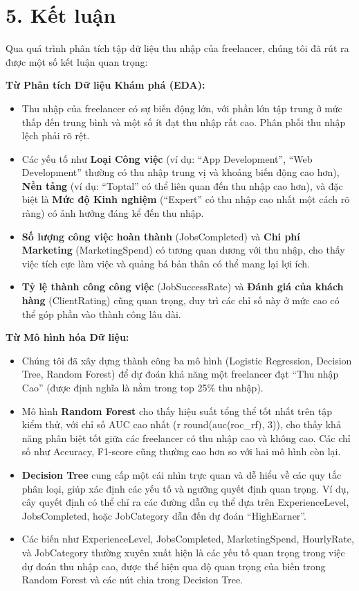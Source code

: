 \documentclass[
]{article}
\begin{document}
\section{5. Kết luận}\label{kux1ebft-luux1eadn}

Qua quá trình phân tích tập dữ liệu thu nhập của freelancer, chúng tôi
đã rút ra được một số kết luận quan trọng:

\textbf{Từ Phân tích Dữ liệu Khám phá (EDA):}

\begin{itemize}
\item
  Thu nhập của freelancer có sự biến động lớn, với phần lớn tập trung ở
  mức thấp đến trung bình và một số ít đạt thu nhập rất cao. Phân phối
  thu nhập lệch phải rõ rệt.
\item
  Các yếu tố như \textbf{Loại Công việc} (ví dụ: ``App Development'',
  ``Web Development'' thường có thu nhập trung vị và khoảng biến động
  cao hơn), \textbf{Nền tảng} (ví dụ: ``Toptal'' có thể liên quan đến
  thu nhập cao hơn), và đặc biệt là \textbf{Mức độ Kinh nghiệm}
  (``Expert'' có thu nhập cao nhất một cách rõ ràng) có ảnh hưởng đáng
  kể đến thu nhập.
\item
  \textbf{Số lượng công việc hoàn thành} (JobsCompleted) và \textbf{Chi
  phí Marketing} (MarketingSpend) có tương quan dương với thu nhập, cho
  thấy việc tích cực làm việc và quảng bá bản thân có thể mang lại lợi
  ích.
\item
  \textbf{Tỷ lệ thành công công việc} (JobSuccessRate) và \textbf{Đánh
  giá của khách hàng} (ClientRating) cũng quan trọng, duy trì các chỉ số
  này ở mức cao có thể góp phần vào thành công lâu dài.
\end{itemize}

\textbf{Từ Mô hình hóa Dữ liệu:}

\begin{itemize}
\item
  Chúng tôi đã xây dựng thành công ba mô hình (Logistic Regression,
  Decision Tree, Random Forest) để dự đoán khả năng một freelancer đạt
  ``Thu nhập Cao'' (được định nghĩa là nằm trong top 25\% thu nhập).
\item
  Mô hình \textbf{Random Forest} cho thấy hiệu suất tổng thể tốt nhất
  trên tập kiểm thử, với chỉ số AUC cao nhất (r round(auc(roc\_rf), 3)),
  cho thấy khả năng phân biệt tốt giữa các freelancer có thu nhập cao và
  không cao. Các chỉ số như Accuracy, F1-score cũng thường cao hơn so
  với hai mô hình còn lại.
\item
  \textbf{Decision Tree} cung cấp một cái nhìn trực quan và dễ hiểu về
  các quy tắc phân loại, giúp xác định các yếu tố và ngưỡng quyết định
  quan trọng. Ví dụ, cây quyết định có thể chỉ ra các đường dẫn cụ thể
  dựa trên ExperienceLevel, JobsCompleted, hoặc JobCategory dẫn đến dự
  đoán ``HighEarner''.
\item
  Các biến như ExperienceLevel, JobsCompleted, MarketingSpend,
  HourlyRate, và JobCategory thường xuyên xuất hiện là các yếu tố quan
  trọng trong việc dự đoán thu nhập cao, được thể hiện qua độ quan trọng
  của biến trong Random Forest và các nút chia trong Decision Tree.
\end{itemize}
\end{document}
